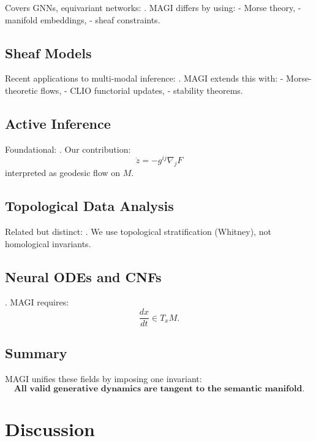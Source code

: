 \documentclass[11pt,a4paper,twocolumn]{article}
\begin{document}
Covers GNNs, equivariant networks:
\cite{bronstein2021geometric, cohen2016group}.  
MAGI differs by using:
- Morse theory,
- manifold embeddings,
- sheaf constraints.

\subsection{Sheaf Models}

Recent applications to multi-modal inference:
\cite{robinson2021sheaves, curry2014sheaves}.  
MAGI extends this with:
- Morse-theoretic flows,
- CLIO functorial updates,
- stability theorems.

\subsection{Active Inference}

Foundational:
\cite{friston2010freeenergy, buckley2017activeinference}.  
Our contribution:
\[
\dot z = - g^{ij} \nabla_j F
\]
interpreted as geodesic flow on $M$.

\subsection{Topological Data Analysis}

Related but distinct:
\cite{ghrist2008barcodes}.  
We use topological stratification (Whitney), not homological invariants.

\subsection{Neural ODEs and CNFs}

\cite{chen2018neuralode, grathwohl2018ffjord}.  
MAGI requires:
\[
\frac{dx}{dt} \in T_x M.
\]

\subsection{Summary}

MAGI unifies these fields by imposing one invariant:
\[
\textbf{All valid generative dynamics are tangent to the semantic manifold.}
\]


\section{Discussion}
\end{document}
